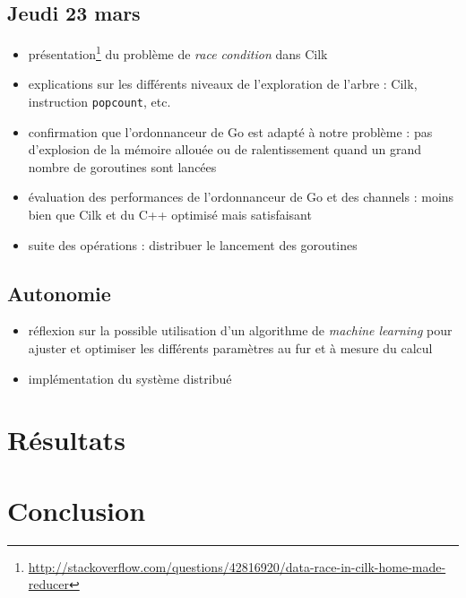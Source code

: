 \documentclass[12pt,a4paper]{article}
\begin{document}
\subsection*{Jeudi 23 mars}
\begin{itemize}
	\item	présentation\footnote{\url{http://stackoverflow.com/questions/42816920/data-race-in-cilk-home-made-reducer}} du problème de \emph{race condition} dans Cilk
	\item	explications sur les différents niveaux de l'exploration de l'arbre : Cilk, instruction \texttt{popcount}, etc.
	\item	confirmation que l'ordonnanceur de Go est adapté à notre problème : pas d'explosion de la mémoire allouée ou de ralentissement quand un grand nombre de goroutines sont lancées
	\item	évaluation des performances de l'ordonnanceur de Go et des channels : moins bien que Cilk et du C++ optimisé mais satisfaisant
	\item	suite des opérations : distribuer le lancement des goroutines
\end{itemize}

\subsection*{Autonomie}
\begin{itemize}
	\item	réflexion sur la possible utilisation d'un algorithme de \emph{machine learning} pour ajuster et optimiser les différents paramètres au fur et à mesure du calcul
	\item	implémentation du système distribué
\end{itemize}

\section*{Résultats}

\section*{Conclusion}
\end{document}

